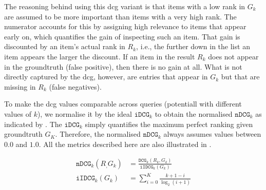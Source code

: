 The reasoning behind using this \acrshort{dcg} variant is that items with a low rank in $G_k$ are assumed to be more important than items with a very high rank. The numerator accounts for this by assigning high relevance to items that appear early on, which quantifies the gain of inspecting such an item. That gain is discounted by an item's actual rank in $R_k$, i.e., the further down in the list an item appears the larger the discount. If an item in the result $R_k$ does not appear in the groundtruth (false positive), then there is no gain at all. What is not directly captured by the \acrshort{dcg}, however, are entries that appear in $G_k$ but that are missing in $R_k$ (false negatives).

To make the \acrshort{dcg} values comparable across queries (potentiall with different values of $k$), we normalise it by the ideal $\mathtt{iDCG}_k$ to obtain the normalised $\mathtt{nDCG}_k$ as indicated by . The $\mathtt{iDCG}_k$ simply quantifies the maximum perfect ranking given groundtruth $G_K$. Therefore, the normalised $\mathtt{nDCG}_k$ always assumes values between $0.0$ and $1.0$. All the metrics described here are also illustrated in .

\begin{align}
    \label{equation:ndcg}
    \mathtt{nDCG}_k(R_, G_k) &= \frac{\mathtt{DCG}_k(R_k, G_k)}{\mathtt{iIDCG}_k(G_k)} \\
    \mathtt{iIDCG}_k(G_k) &= \sum_{i = 0}^{K} \frac{k + 1 - i}{\log_2(i + 1)}
\end{align}

